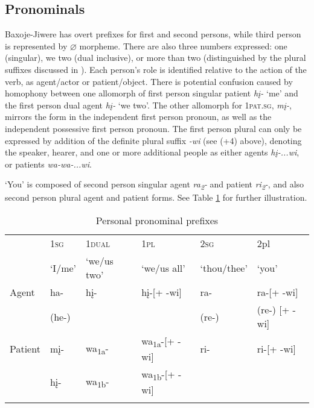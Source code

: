 \documentclass[output=paper]{LSP/langsci}
\begin{document}
\subsection{Pronominals}
Baxoje-Jiwere has overt prefixes for first and second persons, while third person is represented by $\varnothing$ morpheme.  There are also three numbers expressed:  one (singular), we two (dual inclusive), or more than two (distinguished by the plural suffixes discussed in ).  Each person's role is identified relative to the action of the verb, as agent/actor or patient/object. There is potential confusion caused by homophony between one allomorph of first person singular patient \textit{h\k{i}-} `me' and the first person dual agent \textit{h\k{i}-} `we two'.  The other allomorph for 1\textsc{pat.sg}, \textit{m\k{i}-}, mirrors the form in the independent first person pronoun, as well as the independent possessive first person  pronoun.  The first person plural can only be expressed by addition of the definite plural suffix \textit{-wi} (see (+4) above), denoting the speaker, hearer, and one or more additional people as either agents \textit{h\k{i}-...wi}, or patients \textit{wa-wa-...wi}.  

`You' is composed of second person singular agent \textit{ra\textsubscript{2}-} and patient \textit{ri\textsubscript{2}-}, and also second person plural agent and patient forms.  See Table \ref{personalpronominals} for further illustration. 

\begin{table}
\begin{tabular}{ l l l l l l }
\lsptoprule
& 1\textsc{sg} &  1\textsc{dual} & 1\textsc{pl}  & 2\textsc{sg} &  2{pl}  \\
& `I/me' & `we/us two' & `we/us all' & `thou/thee' & `you' \\
\midrule
Agent & ha-  	& h\k{i}- & h\k{i}-[+ -wi] & ra-  & ra-[+ -wi] \\
& (he-) & & &(re-) & (re-) [+ -wi] \\

Patient & m\k{i}- & wa\textsubscript{1a}-	& wa\textsubscript{1a}-[+ -wi]	&  ri- & ri-[+ -wi] \\
& h\k{i}-	& wa\textsubscript{1b}- & wa\textsubscript{1b}-[+ -wi]	& & \\
\lspbottomrule \end{tabular}

\caption{Personal pronominal prefixes} \label{personalpronominals}
\end{table}
\end{document}
